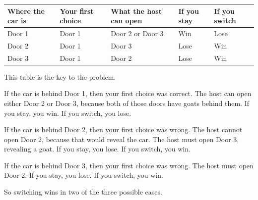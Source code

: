 \documentclass[
  letterpaper,
  DIV=11,
  numbers=noendperiod]{scrreprt}
\newcounter{none} %
\begin{document}
{\def\LTcaptype{none} %
\begin{longtable}[]{@{}
  >{\raggedright\arraybackslash}p{}
  >{\raggedright\arraybackslash}p{}
  >{\raggedright\arraybackslash}p{}
  >{\raggedright\arraybackslash}p{}
  >{\raggedright\arraybackslash}p{}@{}}
\toprule\noalign{}
\begin{minipage}[b]{\linewidth}\raggedright
Where the car is
\end{minipage} & \begin{minipage}[b]{\linewidth}\raggedright
Your first choice
\end{minipage} & \begin{minipage}[b]{\linewidth}\raggedright
What the host can open
\end{minipage} & \begin{minipage}[b]{\linewidth}\raggedright
If you stay
\end{minipage} & \begin{minipage}[b]{\linewidth}\raggedright
If you switch
\end{minipage} \\
\midrule\noalign{}
\endhead
\bottomrule\noalign{}
\endlastfoot
Door 1 & Door 1 & Door 2 or Door 3 & Win & Lose \\
Door 2 & Door 1 & Door 3 & Lose & Win \\
Door 3 & Door 1 & Door 2 & Lose & Win \\
\end{longtable}
}

This table is the key to the problem.

If the car is behind Door 1, then your first choice was correct. The
host can open either Door 2 or Door 3, because both of those doors have
goats behind them. If you stay, you win. If you switch, you lose.

If the car is behind Door 2, then your first choice was wrong. The host
cannot open Door 2, because that would reveal the car. The host must
open Door 3, revealing a goat. If you stay, you lose. If you switch, you
win.

If the car is behind Door 3, then your first choice was wrong. The host
must open Door 2. If you stay, you lose. If you switch, you win.

So switching wins in two of the three possible cases.
\end{document}

